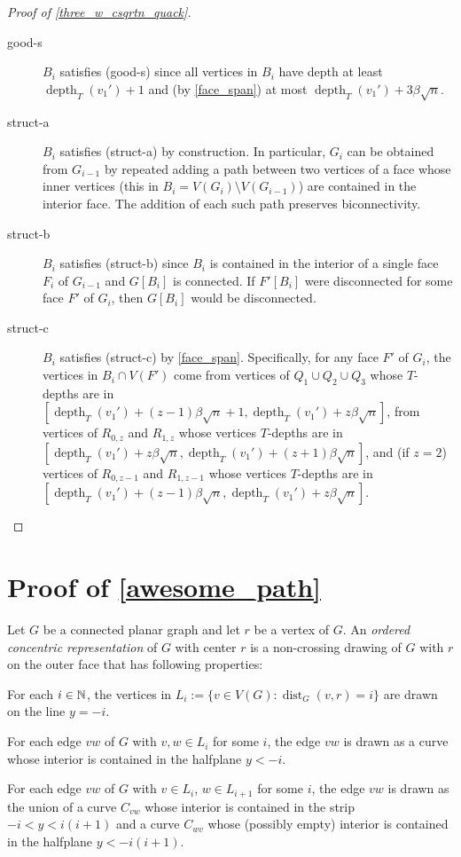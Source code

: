 \documentclass{patmorin}
\newcommand{\defin}[1]{\emph{\textcolor{brightmaroon}{#1}}}
\DeclareMathOperator{\dist}{dist}
\DeclareMathOperator{\depth}{depth}
\begin{document}
\begin{proof}[Proof of \cref{three_w_csqrtn_quack}]
\begin{description}
    \item[good-s] $B_i$ satisfies (good-s) since all vertices in $B_i$ have depth at least $\depth_T(v_1')+1$ and (by \cref{face_span}) at most $\depth_T(v_1')+3\beta\sqrt{n}$.

    \item[struct-a] $B_i$ satisfies (struct-a) by construction.  In particular, $G_i$ can be obtained from $G_{i-1}$ by repeated adding a path between two vertices of a face whose inner vertices (this in $B_i=V(G_i)\setminus V(G_{i-1})$) are contained in the interior face.  The addition of each such path preserves biconnectivity.

    \item[struct-b] $B_i$ satisfies (struct-b) since $B_i$ is contained in the interior of a single face $F_i$ of $G_{i-1}$ and $G[B_i]$ is connected.  If $F'[B_i]$ were disconnected for some face $F'$ of $G_i$, then $G[B_i]$ would be disconnected.

    \item[struct-c] $B_i$ satisfies (struct-c) by \cref{face_span}.  Specifically, for any face $F'$ of $G_i$, the vertices in $B_i\cap V(F')$ come from vertices of $Q_1\cup Q_2\cup Q_3$ whose $T$-depths are in $[\depth_T(v_1')+(z-1)\beta\sqrt{n}+1,\depth_T(v_1')+z\beta\sqrt{n}]$, from vertices of $R_{0,z}$ and $R_{1,z}$ whose vertices $T$-depths are in $[\depth_T(v_1')+z\beta\sqrt{n},\depth_T(v_1')+(z+1)\beta\sqrt{n}]$, and (if $z=2$) vertices of $R_{0,z-1}$ and $R_{1,z-1}$ whose vertices $T$-depths are in $[\depth_T(v_1')+(z-1)\beta\sqrt{n},\depth_T(v_1')+z\beta\sqrt{n}]$. \qedhere
  \end{description}
\end{proof}



\section{Proof of \cref{awesome_path}}
\label{crux_section}


Let $G$ be a connected planar graph and let $r$ be a vertex of $G$.
An \defin{ordered concentric representation} of $G$ with center $r$ is a non-crossing drawing of $G$ with $r$ on the outer face that has following properties:
\begin{compactenum}[(i)]
  \item For each $i\in\mathbb{N}$, the vertices in $L_i:=\{v\in V(G):\dist_G(v,r)=i\}$ are drawn on the line $y=-i$.
  \item For each edge $vw$ of $G$ with $v,w\in L_i$ for some $i$, the edge $vw$ is drawn as a curve whose interior is contained in the halfplane $y<-i$.
  \item For each edge $vw$ of $G$ with $v\in L_i$, $w\in L_{i+1}$ for some $i$, the edge $vw$ is drawn as the union of a curve $C_{vw}$ whose interior is contained in the strip $-i< y<i(i+1)$ and a curve $C_{wv}$ whose (possibly empty) interior is contained in the halfplane $y<-i(i+1)$.
\end{compactenum}
\end{document}

